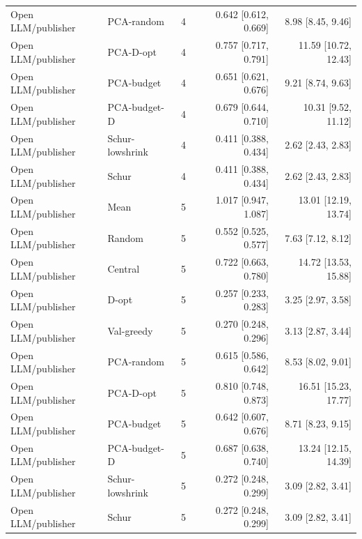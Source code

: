 \begin{longtable}{lllrr}
Open LLM/publisher & PCA-random & 4 & 0.642 [0.612, 0.669] & 8.98 [8.45, 9.46]\\
Open LLM/publisher & PCA-D-opt & 4 & 0.757 [0.717, 0.791] & 11.59 [10.72, 12.43]\\
Open LLM/publisher & PCA-budget & 4 & 0.651 [0.621, 0.676] & 9.21 [8.74, 9.63]\\
Open LLM/publisher & PCA-budget-D & 4 & 0.679 [0.644, 0.710] & 10.31 [9.52, 11.12]\\
Open LLM/publisher & Schur-lowshrink & 4 & 0.411 [0.388, 0.434] & 2.62 [2.43, 2.83]\\
Open LLM/publisher & Schur & 4 & 0.411 [0.388, 0.434] & 2.62 [2.43, 2.83]\\
Open LLM/publisher & Mean & 5 & 1.017 [0.947, 1.087] & 13.01 [12.19, 13.74]\\
Open LLM/publisher & Random & 5 & 0.552 [0.525, 0.577] & 7.63 [7.12, 8.12]\\
Open LLM/publisher & Central & 5 & 0.722 [0.663, 0.780] & 14.72 [13.53, 15.88]\\
Open LLM/publisher & D-opt & 5 & 0.257 [0.233, 0.283] & 3.25 [2.97, 3.58]\\
Open LLM/publisher & Val-greedy & 5 & 0.270 [0.248, 0.296] & 3.13 [2.87, 3.44]\\
Open LLM/publisher & PCA-random & 5 & 0.615 [0.586, 0.642] & 8.53 [8.02, 9.01]\\
Open LLM/publisher & PCA-D-opt & 5 & 0.810 [0.748, 0.873] & 16.51 [15.23, 17.77]\\
Open LLM/publisher & PCA-budget & 5 & 0.642 [0.607, 0.676] & 8.71 [8.23, 9.15]\\
Open LLM/publisher & PCA-budget-D & 5 & 0.687 [0.638, 0.740] & 13.24 [12.15, 14.39]\\
Open LLM/publisher & Schur-lowshrink & 5 & 0.272 [0.248, 0.299] & 3.09 [2.82, 3.41]\\
Open LLM/publisher & Schur & 5 & 0.272 [0.248, 0.299] & 3.09 [2.82, 3.41]\\
\bottomrule\end{longtable}